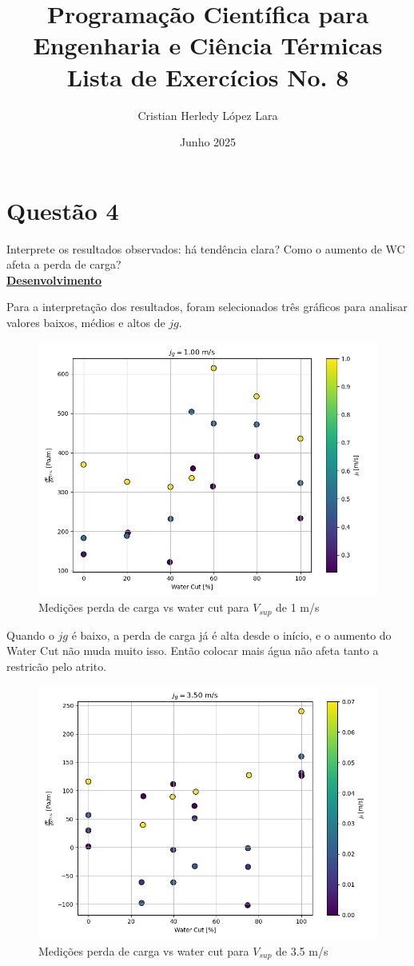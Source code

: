 \documentclass[12pt]{article}
\title{\textbf{Programação Científica para Engenharia e Ciência Térmicas \\Lista de Exercícios No. 8}}
\author{Cristian Herledy López Lara}
\date{Junho 2025}
\begin{document}
	
\maketitle


\section*{Questão 4}

Interprete os resultados observados: há tendência clara? Como o aumento de WC afeta a perda de carga? \\


\textbf{\underline{Desenvolvimento}}

Para a interpretação dos resultados, foram selecionados três gráficos para analisar valores baixos, médios e altos de $jg$.

\begin{figure}[H]
	\centering
	\includegraphics[width=.65\textwidth]{figures/1}
	\caption{Medições perda de carga vs water cut para $V_{sup}$ de 1 m/s}
\end{figure}

Quando o $jg$ é baixo, a perda de carga já é alta desde o início, e o aumento do Water Cut não muda muito isso. Então colocar mais água não afeta tanto a restricão pelo atrito.

\begin{figure}[H]
	\centering
	\includegraphics[width=.65\textwidth]{figures/3}
	\caption{Medições perda de carga vs water cut para $V_{sup}$ de 3.5 m/s}
\end{figure}
\end{document}

